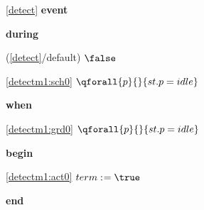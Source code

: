 \noindent \ref{detect}  \textbf{event}
\begin{block}
  \item   \textbf{during}
  \begin{block}
  \item[ (\ref{detect}/default) ]\sout{$\false$} %
  \end{block}
  \begin{block}
  \item[ \eqref{detectm1:sch0} ]{$\qforall{p}{}{st.p = idle} $} %
  \end{block}
  \item   \textbf{when}
  \begin{block}
  \item[ \eqref{detectm1:grd0} ]{$\qforall{p}{}{st.p = idle} $} %
  \end{block}
  \item   \textbf{begin}
  \begin{block}
  \item[ \eqref{detectm1:act0} ]{$term \bcmeq \true$} %
  \end{block}
  \item   \textbf{end} \\
\end{block}
